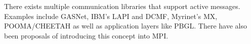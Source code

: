 
There exists multiple communication libraries that 
support active messages. Examples include GASNet, 
IBM's LAPI and DCMF, Myrinet's MX, POOMA/CHEETAH 
as well as application layers like PBGL. There 
have also been proposals of introducing this 
concept into MPI. 

